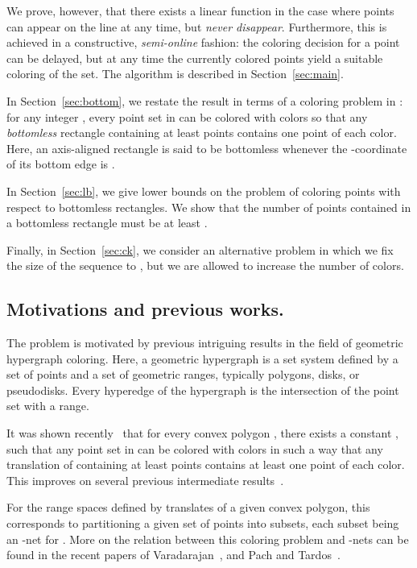 \documentclass[11pt,a4paper]{amsart}
\theoremstyle{plain}
\theoremstyle{definition}
\begin{document}
We prove, however, that there exists a linear function  in the case where points can appear on the line at any time, but {\em never disappear}. Furthermore, this is achieved in a constructive, {\em semi-online} fashion: the coloring decision for a point can be delayed, but at any time the currently colored points yield a suitable coloring of the set. The algorithm is described in Section~\ref{sec:main}.

In Section~\ref{sec:bottom}, we restate the result in terms of a coloring problem in : for any integer , every point set in  can be colored with  colors so that any {\em bottomless} rectangle containing at least  points contains one point of each color. Here, an axis-aligned rectangle is said to be bottomless whenever the -coordinate of its bottom edge is . 

In Section~\ref{sec:lb}, we give lower bounds on the problem of coloring points with respect to bottomless rectangles. We show that the number of points  contained in a bottomless rectangle must be at least . 

Finally, in Section~\ref{sec:ck}, we consider an alternative problem in which we fix the size of the sequence to , but we are allowed to increase the number of colors.

\subsection*{Motivations and previous works.}

The problem is motivated by previous intriguing results in the field of geometric hypergraph coloring. Here, a geometric hypergraph is a set system defined by a set of points and a set of geometric ranges, typically polygons, disks, or pseudodisks. Every hyperedge of the hypergraph is the intersection of the point set with a range.

It was shown recently~\cite{GV11} that for every convex polygon , there exists a constant , such that any point set in  
can be colored with  colors in such a way that any translation of  containing at least  points contains at least one point of each color.
This improves on several previous intermediate results~\cite{PT09,PT10,ACCLOR10}.

For the range spaces defined by translates of a given convex polygon, this corresponds to partitioning a given set of  points into  subsets, each subset being
an -net for . More on the relation between this coloring problem and -nets can be found in the recent papers of 
Varadarajan~\cite{V10}, and Pach and Tardos~\cite{PT11}.
\end{document}

